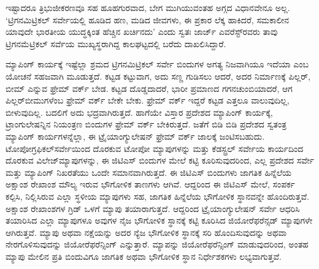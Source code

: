 ಇಷ್ಟಾದರೂ ತ್ರಿಭುಜೀಕರಣವೂ ಸಹ ಹೂಹಗುರವಾದ, ಬೇಗ ಮುಗಿಯುವಂತಹ ಅಗ್ಗದ ವಿಧಾನವೇನೂ ಅಲ್ಲ. ‘ಟ್ರಿಗನಮಿಟ್ರಿಕಲ್​ ಸರ್ವೇಯಲ್ಲಿ ಹೂಡಿದ ಹಣ, ಮಡಿದ ಜೀವಗಳು, ಈ ಪ್ರಕಾರ ಲೆಕ್ಕ ಹಾಕಿದರೆ, ಸಮಕಾಲೀನ ಯಾವುದೇ ಭಾರತೀಯ ಯುದ್ಧಕ್ಕಿಂತ ಹೆಚ್ಚಿನ ಖರ್ಚಿನದು’ ಎಂದು ಸ್ವತಃ ಜಾರ್ಜ್ ಎವರೆಸ್ಟ್​ರವರು ತಾವು ಟ್ರಿಗನಮೆಟ್ರಿಕಲ್ ಸರ್ವೆಯ ಮುಖ್ಯಸ್ಥರಾಗಿದ್ದ ಕಾಲಘಟ್ಟದಲ್ಲಿ ಬರೆದು ದಾಖಲಿಸಿದ್ದಾರೆ.

\newpage

ಮ್ಯಾಪಿಂಗ್​ ಕಾರ್ಯಕ್ಕೆ ಇಷ್ಟೆಲ್ಲಾ ಶ್ರಮದ ಟ್ರಿಗನಮಿಟ್ರಿಕಲ್​ ಸರ್ವೇ ಬಿಂದುಗಳ ಅಗತ್ಯ ನಿಜವಾಗಿಯೂ ಇದೆಯಾ ಎಂಬ ಯೋಚನೆ ಸಹಜವಾಗಿ ಮೂಡುತ್ತದೆ. ಕಟ್ಟಡ ಕಟ್ಟುವಾಗ, ಅದು ಸಣ್ಣ ಗುಡಿಸಲು ಆದರೆ, ಅದರ ನಿರ್ಮಾಣಕ್ಕೆ ಪಿಲ್ಲರ್​, ಬೀಮ್ ಎನ್ನುವ ಫ್ರೇಮ್ ವರ್ಕ್ ಬೇಡ. ಕಟ್ಟಡ ದೊಡ್ಡದಾದರೆ, ಭಾರೀ ಪ್ರಮಾಣದ ಗಗನಚುಂಬಿಯಾದರೆ, ಆಗ ಪಿಲ್ಲರ್​ ಬೀಮುಗಳೆಂಬ ಫ್ರೇಮ್ ವರ್ಕ್ ಬೇಕೇ ಬೇಕು. ಫ್ರೇಮ್ ವರ್ಕ್ ಇದ್ದರೆ ಕಟ್ಟಡ ಎತ್ತಲೂ ವಾಲುವುದಿಲ್ಲ, ಬೀಳುವುದಿಲ್ಲ. ಬದಲಿಗೆ ಅದು ಭದ್ರವಾಗಿರುತ್ತದೆ. ಹಾಗೆಯೇ ವಿಸ್ತಾರ ಪ್ರದೇಶದ ಮ್ಯಾಪಿಂಗ್​ ಕಾರ್ಯಕ್ಕೆ, ಟ್ರಾಂಗುಲೇಷನ್ನಿನ ನಿಯಂತ್ರಣ ಬಿಂದುಗಳ ಫ್ರೇಮ್ ವರ್ಕ್ ಬೇಕಿರುತ್ತದೆ. ಜತೆಗೆ ಬಿಡಿ ಬಿಡಿ ಪ್ರದೇಶದ ಸ್ವತಂತ್ರ ಮ್ಯಾಪಿಂಗ್​ ಕಾರ್ಯಗಳನ್ನೆಲ್ಲಾ, ಈ ಟ್ರೈಯಾಂಗ್ಯುಲೇಷನ್​ ಫ್ರೇಮ್ ವರ್ಕ್ ಜಾಲಕ್ಕೆ ಜಂಟಿಸಬಹುದು. ಟೋಪೋಗ್ರಫಿಕಲ್​ ಸರ್ವೇಯಿಂದ ದೊರಕುವ ಟೋಪೋ ಮ್ಯಾಪುಗಳನ್ನು ಮತ್ತು ಕೆಡಸ್ಟ್ರಲ್​ ಸರ್ವೇಯ ಕಾರ್ಯದಿಂದ ದೊರಕುವ ವಿಲೇಜ್​ ಮ್ಯಾಪುಗಳನ್ನು, ಈ ಜಿಟಿಎಸ್​ ಬಿಂದುಗಳ ಮೇಲೆ ಕಟ್ಟಿ ಕೂರಿಸುವುದರಿಂದ, ಎಲ್ಲ ಪ್ರದೇಶದ ಸರ್ವೇ ಮತ್ತು ಮ್ಯಾಪಿಂಗ್​ ನಿಖರತೆಯು ಒಂದೇ ಸಮಾನವಾಗಿರುತ್ತದೆ. ಈ ಜಿಟಿಎಸ್​ ಬಿಂದುಗಳು ಜಾಗತಿಕ ಹಿನ್ನೆಲೆಯ ಅಕ್ಷಾಂಶ ರೇಖಾಂಶ ಮೌಲ್ಯ ಇರುವ ಭೌಗೋಳಿಕ ತಾಣಗಳು ಆಗಿವೆ. ಆದ್ದರಿಂದ ಈ ಜಿಟಿಎಸ್​ ಮೇಲೆ, ಸಂಪರ್ಕ ಕಲ್ಪಿಸಿ, ನಿಲ್ಲಿಸಿರುವ ಎಲ್ಲಾ ಸ್ಥಳೀಯ ಮ್ಯಾಪುಗಳು ಸಹ, ಜಾಗತಿಕ ಹಿನ್ನೆಲೆಯ ಭೌಗೋಳಿಕ ಸ್ಥಾನವನ್ನೇ ಹೊಂದಿರುತ್ತವೆ. ಅಕ್ಷಾಂಶ ರೇಖಾಂಶಗಳ ಗ್ರಿಡ್​ ಒಳಗೆ ಮ್ಯಾಪು ತಯಾರಾಗುತ್ತದೆ. ಆದ್ದರಿಂದ ಟ್ರೈಯಾಂಗ್ಯುಲೇಷನ್​ ಸರ್ವೇ ಆಧರಿಸಿ ತಯಾರಿಸಿದ ಎಲ್ಲಾ ಮ್ಯಾಪುಗಳೂ ಅವುಗಳ ನೈಜ ಭೌಗೋಳಿಕ ಸ್ಥಾನಕ್ಕೆ ಕಟ್ಟಿ ಕೂರಿಸಿದ ಜಿಯೋರೆಫರೆನ್ಸಡ್​ ಮ್ಯಾಪುಗಳೇ ಆಗಿರುತ್ತವೆ. ಮ್ಯಾಪು ಅಥವಾ ನಕ್ಷೆಯನ್ನು ಅದರ ನ್ಯೆಜ ಭೌಗೋಳಿಕ ಸ್ಥಾನಕ್ಕೆ ಸರಿ ಹೊಂದಿಸುವುದನ್ನು ಅಥವಾ ನೇರಗೊಳಿಸುವುದನ್ನು ಜಿಯೋರೆಫರೆನ್ಸಿಂಗ್​ ಎನ್ನುತ್ತಾರೆ. ಮ್ಯಾಪನ್ನು ಜಿಯೋರೆಫರೆನ್ಸಿಂಗ್​ ಮಾಡುವುದರಿಂದ, ಅಂತಹ ಮ್ಯಾಪು ಮೇಲಿನ ಪ್ರತಿ ಬಿಂದುವಿಗೂ ಜಾಗತಿಕ ಅಥವಾ ಭೌಗೋಳಿಕ ಸ್ಥಾನ ನಿರ್ಧೇಶಕಗಳು ಲಭ್ಯವಾಗುತ್ತವೆ.

